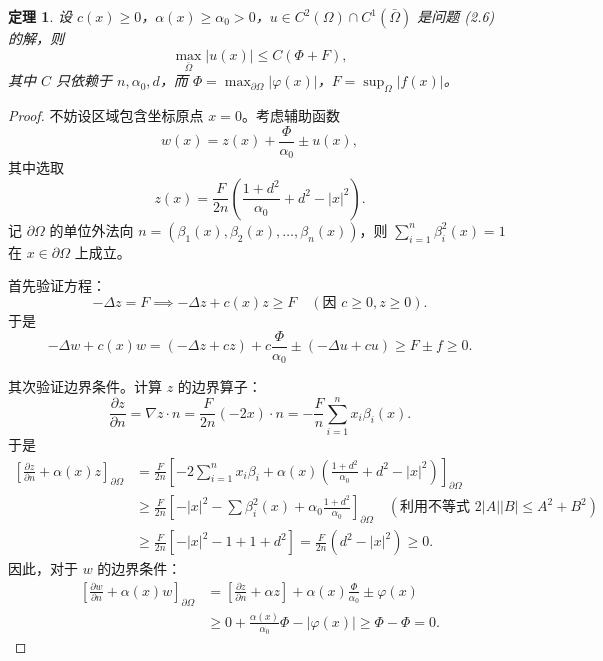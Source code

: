 \documentclass[12pt,a4paper]{ctexart}
\newtheorem{theorem}{定理}[section]
\begin{document}
	\begin{theorem}
		设 $c(x) \ge 0$，$\alpha(x) \ge \alpha_0 > 0$，$u \in C^2(\Omega) \cap C^1(\bar{\Omega})$ 是问题 (2.6) 的解，则
		\begin{equation}
			\max_{\bar{\Omega}} |u(x)| \le C(\Phi + F),
		\end{equation}
		其中 $C$ 只依赖于 $n, \alpha_0, d$，而 $\Phi = \max_{\partial \Omega}|\varphi(x)|$，$F = \sup_{\Omega}|f(x)|$。
	\end{theorem}
	
	\begin{proof}
		不妨设区域包含坐标原点 $x=0$。考虑辅助函数
		\[
		w(x) = z(x) + \frac{\Phi}{\alpha_0} \pm u(x),
		\]
		其中选取
		\[
		z(x) = \frac{F}{2n} \left( \frac{1+d^2}{\alpha_0} + d^2 - |x|^2 \right).
		\]
		记 $\partial \Omega$ 的单位外法向 $n = (\beta_1(x), \beta_2(x), \dots, \beta_n(x))$，则 $\sum_{i=1}^n \beta_i^2(x) = 1$ 在 $x \in \partial \Omega$ 上成立。
		
		首先验证方程：
		\[
		-\Delta z = F \implies -\Delta z + c(x)z \ge F \quad (\text{因 } c \ge 0, z \ge 0).
		\]
		于是
		\begin{equation}
			-\Delta w + c(x)w = (-\Delta z + cz) + c\frac{\Phi}{\alpha_0} \pm (-\Delta u + cu) \ge F \pm f \ge 0. \tag{2.7}
		\end{equation}
		
		其次验证边界条件。计算 $z$ 的边界算子：
		\[
		\frac{\partial z}{\partial n} = \nabla z \cdot n = \frac{F}{2n} (-2x) \cdot n = -\frac{F}{n} \sum_{i=1}^n x_i \beta_i(x).
		\]
		于是
		\[
		\begin{aligned}
			\left[ \frac{\partial z}{\partial n} + \alpha(x)z \right]_{\partial \Omega} 
			&= \frac{F}{2n} \left[ -2\sum_{i=1}^n x_i \beta_i + \alpha(x) \left( \frac{1+d^2}{\alpha_0} + d^2 - |x|^2 \right) \right]_{\partial \Omega} \\
			&\ge \frac{F}{2n} \left[ -|x|^2 - \sum \beta_i^2(x) + \alpha_0 \frac{1+d^2}{\alpha_0} \right]_{\partial \Omega} \quad (\text{利用不等式 } 2|A||B| \le A^2+B^2) \\
			&\ge \frac{F}{2n} \left[ -|x|^2 - 1 + 1 + d^2 \right] = \frac{F}{2n}(d^2 - |x|^2) \ge 0.
		\end{aligned}
		\]
		因此，对于 $w$ 的边界条件：
		\begin{equation}
			\begin{aligned}
				\left[ \frac{\partial w}{\partial n} + \alpha(x)w \right]_{\partial \Omega} 
				&= \left[ \frac{\partial z}{\partial n} + \alpha z \right] + \alpha(x)\frac{\Phi}{\alpha_0} \pm \varphi(x) \\
				&\ge 0 + \frac{\alpha(x)}{\alpha_0}\Phi - |\varphi(x)| \ge \Phi - \Phi = 0.
			\end{aligned} \tag{2.8}
		\end{equation}
		

\end{proof}
\end{document}
